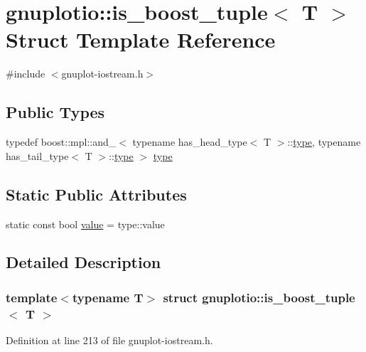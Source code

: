 \hypertarget{structgnuplotio_1_1is__boost__tuple}{}\section{gnuplotio\+:\+:is\+\_\+boost\+\_\+tuple$<$ T $>$ Struct Template Reference}
\label{structgnuplotio_1_1is__boost__tuple}


{\ttfamily \#include $<$gnuplot-\/iostream.\+h$>$}

\subsection*{Public Types}
\begin{DoxyCompactItemize}
\item 
typedef boost\+::mpl\+::and\+\_\+$<$ typename has\+\_\+head\+\_\+type$<$ T $>$\+::\hyperlink{structgnuplotio_1_1is__boost__tuple_ad771f62833b23ecae5dc689e6248396a}{type}, typename has\+\_\+tail\+\_\+type$<$ T $>$\+::\hyperlink{structgnuplotio_1_1is__boost__tuple_ad771f62833b23ecae5dc689e6248396a}{type} $>$ \hyperlink{structgnuplotio_1_1is__boost__tuple_ad771f62833b23ecae5dc689e6248396a}{type}
\end{DoxyCompactItemize}
\subsection*{Static Public Attributes}
\begin{DoxyCompactItemize}
\item 
static const bool \hyperlink{structgnuplotio_1_1is__boost__tuple_ae6664b02421d28585204104af65a4744}{value} = type\+::value
\end{DoxyCompactItemize}


\subsection{Detailed Description}
\subsubsection*{template$<$typename T$>$\newline
struct gnuplotio\+::is\+\_\+boost\+\_\+tuple$<$ T $>$}



Definition at line 213 of file gnuplot-\/iostream.\+h.



